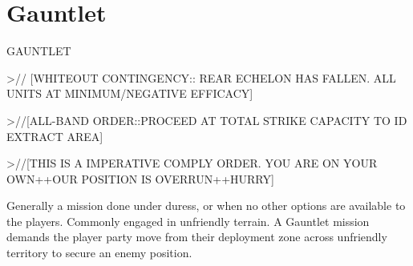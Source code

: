                                                                                                           

\section{Gauntlet}
                                                              

                                                             GAUNTLET  

                                                             >// [WHITEOUT CONTINGENCY:: REAR  
                                                             ECHELON HAS FALLEN. ALL UNITS AT  
                                                             MINIMUM/NEGATIVE EFFICACY]   

                                                             >//[ALL-BAND ORDER::PROCEED AT TOTAL  
                                                             STRIKE CAPACITY TO ID EXTRACT AREA]  

                                                             >//[THIS IS A IMPERATIVE COMPLY ORDER.  
                                                             YOU ARE ON YOUR OWN++OUR POSITION  
                                                             IS OVERRUN++HURRY]   

                                                             Generally a mission done under duress, or  
                                                            when no other options are available to the  
                                                             players. Commonly engaged in unfriendly  
                                                            terrain. A Gauntlet mission demands the  
                                                             player party move from their deployment zone  
                                                             across unfriendly territory to secure an enemy  
                                                             position.  

